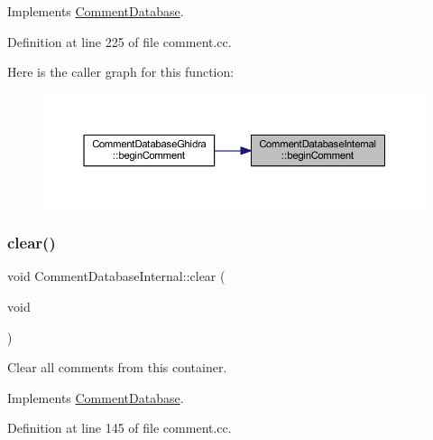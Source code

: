 Implements \mbox{\hyperlink{class_comment_database_a4eb1eb37180fc092244b37ea11f7f2a4}{Comment\+Database}}.



Definition at line 225 of file comment.\+cc.

Here is the caller graph for this function\+:
\nopagebreak
\begin{figure}[H]
\begin{center}
\leavevmode
\includegraphics[width=350pt]{class_comment_database_internal_a23097880c0ad74fdbe692772957844f6_icgraph}
\end{center}
\end{figure}
\mbox{\label{class_comment_database_internal_a19c22a8d1e9ea5ea38c321e778e7c063}} 
\subsubsection{\texorpdfstring{clear()}{clear()}}
{\footnotesize\ttfamily void Comment\+Database\+Internal\+::clear (\begin{DoxyParamCaption}\item[{void}]{ }\end{DoxyParamCaption})\hspace{0.3cm}{\ttfamily [virtual]}}



Clear all comments from this container. 



Implements \mbox{\hyperlink{class_comment_database_a11e384fc79f6cf6e8c7af6c608df4baa}{Comment\+Database}}.



Definition at line 145 of file comment.\+cc.

